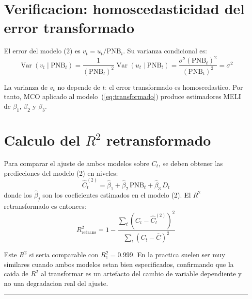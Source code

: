 \documentclass[12pt, letterpaper]{article}
\theoremstyle{remark}
\newcommand{\Var}{\operatorname{Var}}
\begin{document}
\appendix

\section{Verificacion: homoscedasticidad del error transformado}

El error del modelo (2) es $v_t = u_t/\text{PNB}_t$. Su varianza condicional es:
\begin{equation}
  \Var(v_t \mid \text{PNB}_t)
    = \frac{1}{(\text{PNB}_t)^2} \Var(u_t \mid \text{PNB}_t)
    = \frac{\sigma^2(\text{PNB}_t)^2}{(\text{PNB}_t)^2}
    = \sigma^2
  \label{eq:homosc_vt}
\end{equation}

La varianza de $v_t$ no depende de $t$: el error transformado es homoscedastico.
Por tanto, MCO aplicado al modelo~(\ref{eq:transformado}) produce estimadores
MELI de $\beta_1$, $\beta_2$ y $\beta_3$.

\section{Calculo del $R^2$ retransformado}

Para comparar el ajuste de ambos modelos sobre $C_t$, se deben obtener las
predicciones del modelo (2) en niveles:
\begin{equation}
  \hat C_t^{(2)} = \hat\beta_1 + \hat\beta_2\,\text{PNB}_t + \hat\beta_3\,D_t
\end{equation}
donde los $\hat\beta_j$ son los coeficientes estimados en el modelo (2).
El $R^2$ retransformado es entonces:
\begin{equation}
  R^2_{\text{retrans}} = 1 - \frac{\sum_t(C_t - \hat C_t^{(2)})^2}{\sum_t(C_t - \bar C)^2}
\end{equation}

Este $R^2$ si seria comparable con $R^2_1 = 0.999$. En la practica suelen
ser muy similares cuando ambos modelos estan bien especificados, confirmando
que la caida de $R^2$ al transformar es un artefacto del cambio de variable
dependiente y no una degradacion real del ajuste.

\vspace{14pt}
\noindent\rule{\linewidth}{0.4pt}

\end{document}
